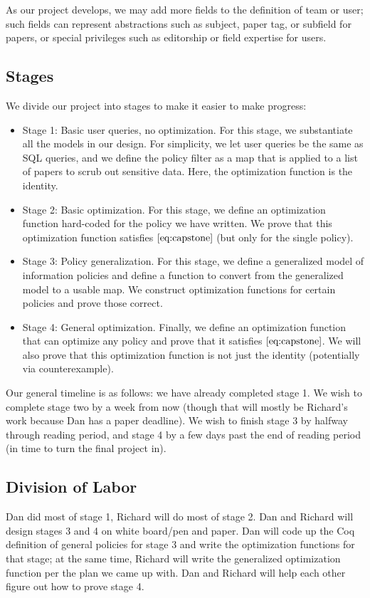 \documentclass[11pt,journal]{IEEEtran}
\begin{document}
As our project develops, we may add more fields to the definition of team or user; such fields can represent abstractions such as subject, paper tag, or subfield for papers, or special privileges such as editorship or field expertise for users.

\subsection{Stages}
We divide our project into stages to make it easier to make progress:
\begin{itemize}
    \item Stage 1: Basic user queries, no optimization. For this stage, we substantiate all the models in our design.  For simplicity, we let user queries be the same as SQL queries, and we define the policy filter as a map that is applied to a list of papers to scrub out sensitive data.  Here, the optimization function is the identity.
    \item Stage 2: Basic optimization.  For this stage, we define an optimization function hard-coded for the policy we have written.  We prove that this optimization function satisfies $\eqref{eq:capstone}$ (but only for the single policy).
    \item Stage 3: Policy generalization.  For this stage, we define a generalized model of information policies and define a function to convert from the generalized model to a usable map.  We construct optimization functions for certain policies and prove those correct.
    \item Stage 4: General optimization.  Finally, we define an optimization function that can optimize any policy and prove that it satisfies $\eqref{eq:capstone}$.  We will also prove that this optimization function is not just the identity (potentially via counterexample).
\end{itemize}

Our general timeline is as follows: we have already completed stage 1.  We wish to complete stage two by a week from now (though that will mostly be Richard's work because Dan has a paper deadline).  We wish to finish stage 3 by halfway through reading period, and stage 4 by a few days past the end of reading period (in time to turn the final project in).

\subsection{Division of Labor}
Dan did most of stage 1, Richard will do most of stage 2.  Dan and Richard will design stages 3 and 4 on white board/pen and paper.  Dan will code up the Coq definition of general policies for stage 3 and write the optimization functions for that stage; at the same time, Richard will write the generalized optimization function per the plan we came up with.  Dan and Richard will help each other figure out how to prove stage 4.
\end{document}
